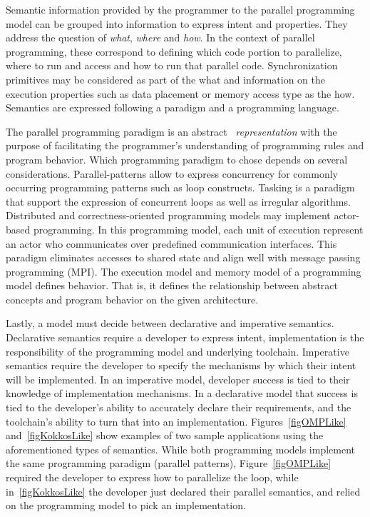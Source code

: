 Semantic information provided by the programmer to the parallel programming model can be grouped into information to express intent and properties. They address the question of \emph{what}, \emph{where} and \emph{how}. In the context of parallel programming, these correspond to defining which code portion to parallelize, where to run and access and how to run that parallel code. Synchronization primitives may be considered as part of the what and information on the execution properties such as data placement or memory access type as the how. Semantics are expressed following a paradigm and a programming language.

The parallel programming paradigm is an abstract ~\emph{representation} with the purpose of facilitating the programmer's understanding of programming rules and program behavior. Which programming paradigm to chose depends on several considerations. Parallel-patterns allow to express concurrency for commonly occurring programming patterns such as loop constructs. Tasking is a paradigm that support the expression of concurrent loops as well as irregular algorithms. Distributed and correctness-oriented programming models may implement actor-based programming. In this programming model, each unit of execution represent an actor who communicates over predefined communication interfaces. This paradigm eliminates accesses to shared state and align well with message passing programming (MPI). The execution model and memory model of a programming model defines behavior. That is, it defines the relationship between abstract concepts and program behavior on the given architecture.

Lastly, a model must decide between declarative and imperative semantics. Declarative semantics require a developer to express intent, implementation is the responsibility of the programming model and underlying toolchain. Imperative semantics require the developer to specify the mechanisms by which their intent will be implemented. In an imperative model, developer success is tied to their knowledge of implementation mechanisms. In a declarative model that success is tied to the developer's ability to accurately declare their requirements, and the toolchain's ability to turn that into an implementation. Figures~\ref{figOMPLike} and~\ref{figKokkosLike} show examples of two sample applications using the aforementioned types of semantics. While both programming models implement the same programming paradigm (parallel patterns), Figure~\ref{figOMPLike} required the developer to express how to parallelize the loop, while in~\ref{figKokkosLike} the developer just declared their parallel semantics, and relied on the programming model to pick an implementation. 

